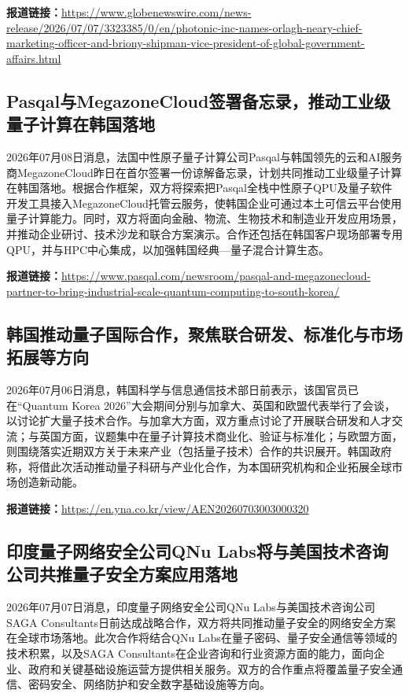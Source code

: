 \documentclass[12pt,a4paper]{ctexart}
\begin{document}
\noindent\textbf{报道链接：}\url{https://www.globenewswire.com/news-release/2026/07/07/3323385/0/en/photonic-inc-names-orlagh-neary-chief-marketing-officer-and-briony-shipman-vice-president-of-global-government-affairs.html}

\subsection{ Pasqal与MegazoneCloud签署备忘录，推动工业级量子计算在韩国落地 }

2026年07月08日消息，法国中性原子量子计算公司Pasqal与韩国领先的云和AI服务商MegazoneCloud昨日在首尔签署一份谅解备忘录，计划共同推动工业级量子计算在韩国落地。根据合作框架，双方将探索把Pasqal全栈中性原子QPU及量子软件开发工具接入MegazoneCloud托管云服务，使韩国企业可通过本土可信云平台使用量子计算能力。同时，双方将面向金融、物流、生物技术和制造业开发应用场景，并推动企业研讨、技术沙龙和联合方案演示。合作还包括在韩国客户现场部署专用QPU，并与HPC中心集成，以加强韩国经典—量子混合计算生态。

\noindent\textbf{报道链接：}\url{https://www.pasqal.com/newsroom/pasqal-and-megazonecloud-partner-to-bring-industrial-scale-quantum-computing-to-south-korea/}

\subsection{ 韩国推动量子国际合作，聚焦联合研发、标准化与市场拓展等方向 }

2026年07月06日消息，韩国科学与信息通信技术部日前表示，该国官员已在“Quantum Korea 2026”大会期间分别与加拿大、英国和欧盟代表举行了会谈，以讨论扩大量子技术合作。与加拿大方面，双方重点讨论了开展联合研发和人才交流；与英国方面，议题集中在量子计算技术商业化、验证与标准化；与欧盟方面，则围绕落实近期双方关于未来产业（包括量子技术）合作的共识展开。韩国政府称，将借此次活动推动量子科研与产业化合作，为本国研究机构和企业拓展全球市场创造新动能。

\noindent\textbf{报道链接：}\url{https://en.yna.co.kr/view/AEN20260703003000320}

\subsection{ 印度量子网络安全公司QNu Labs将与美国技术咨询公司共推量子安全方案应用落地 }

2026年07月07日消息，印度量子网络安全公司QNu Labs与美国技术咨询公司SAGA Consultants日前达成战略合作，双方将共同推动量子安全的网络安全方案在全球市场落地。此次合作将结合QNu Labs在量子密码、量子安全通信等领域的技术积累，以及SAGA Consultants在企业咨询和行业资源方面的能力，面向企业、政府和关键基础设施运营方提供相关服务。双方的合作重点将覆盖量子安全通信、密码安全、网络防护和安全数字基础设施等方向。
\end{document}
